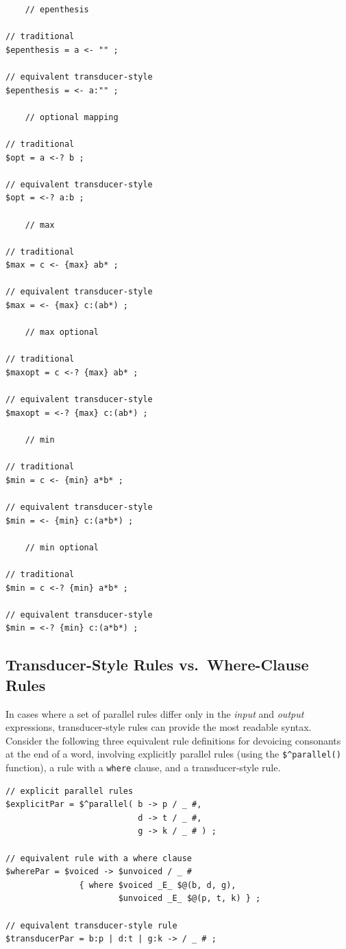 \begin{Verbatim}
	// epenthesis

// traditional
$epenthesis = a <- "" ;

// equivalent transducer-style
$epenthesis = <- a:"" ;

	// optional mapping

// traditional
$opt = a <-? b ;

// equivalent transducer-style
$opt = <-? a:b ;

	// max 

// traditional
$max = c <- {max} ab* ;

// equivalent transducer-style
$max = <- {max} c:(ab*) ;

	// max optional

// traditional
$maxopt = c <-? {max} ab* ;

// equivalent transducer-style
$maxopt = <-? {max} c:(ab*) ;

	// min

// traditional
$min = c <- {min} a*b* ;

// equivalent transducer-style
$min = <- {min} c:(a*b*) ;

	// min optional

// traditional
$min = c <-? {min} a*b* ;

// equivalent transducer-style
$min = <-? {min} c:(a*b*) ;
\end{Verbatim}

\subsection{Transducer-Style Rules vs.\ Where-Clause Rules}

In cases where a set of parallel rules differ only in the \emph{input} and \emph{output} expressions,
transducer-style rules can provide the most readable syntax.  Consider the following three equivalent
rule definitions for devoicing consonants at the end of a word, involving explicitly parallel rules (using the
\verb!$^parallel()! function), a rule with a \texttt{where} clause, and a transducer-style rule.

\begin{Verbatim}
// explicit parallel rules
$explicitPar = $^parallel( b -> p / _ #,  
                           d -> t / _ #,  
						   g -> k / _ # ) ;

// equivalent rule with a where clause
$wherePar = $voiced -> $unvoiced / _ #  
               { where $voiced _E_ $@(b, d, g),
                       $unvoiced _E_ $@(p, t, k) } ;

// equivalent transducer-style rule
$transducerPar = b:p | d:t | g:k -> / _ # ;
\end{Verbatim}

